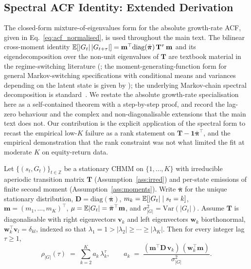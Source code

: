 \subsection{Spectral ACF Identity: Extended Derivation}
\label{sec:supp_spectral_acf}

The closed-form mixture-of-eigenvalues form for the absolute growth-rate ACF, given in Eq.~\eqref{eq:acf_normalised}, is used throughout the main text. The bilinear cross-moment identity $\mathbb{E}[|G_t|\,|G_{t+\tau}|] = \mathbf m^\top \mathrm{diag}(\bar{\boldsymbol\pi})\,\mathbf T^\tau\,\mathbf m$ and its eigendecomposition over the non-unit eigenvalues of $\mathbf T$ are textbook material in the regime-switching literature (\citealp{hamilton1994time,krolzig1997markov}; the moment-generating-function form for general Markov-switching specifications with conditional means and variances depending on the latent state is given by \citealp{timmermann2000moments}); the underlying Markov-chain spectral decomposition is standard~\cite{levinperes2017markov}. We restate the absolute growth-rate specialisation here as a self-contained theorem with a step-by-step proof, and record the lag-zero behaviour and the complex and non-diagonalisable extensions that the main text does not. Our contribution is the explicit application of the spectral form to recast the empirical \citet{ryden1998stylized} low-$K$ failure as a rank statement on $\mathbf T - \mathbf 1\bar{\boldsymbol\pi}^\top$, and the empirical demonstration that the rank constraint was not what limited the fit at moderate $K$ on equity-return data.

\begin{theorem}
\label{thm:supp_spectral_acf}
Let $\{(s_t, G_t)\}_{t \in \mathbb{Z}}$ be a stationary CHMM on $\{1, \ldots, K\}$ with irreducible aperiodic transition matrix $\mathbf T$ (Assumption~\ref{ass:irred}) and per-state emissions of finite second moment (Assumption~\ref{ass:moments}). Write $\bar{\boldsymbol\pi}$ for the unique stationary distribution, $\mathbf D = \mathrm{diag}(\bar{\boldsymbol\pi})$, $m_k = \mathbb{E}[|G_t| \mid s_t = k]$, $\mathbf m = (m_1, \ldots, m_K)^\top$, $\mu = \mathbb{E}|G_t| = \bar{\boldsymbol\pi}^\top \mathbf m$, and $\sigma_{|G|}^2 = \mathrm{Var}(|G_t|)$. Assume $\mathbf T$ is diagonalisable with right eigenvectors $\mathbf v_k$ and left eigenvectors $\mathbf w_k$ biorthonormal, $\mathbf w_k^\top \mathbf v_l = \delta_{kl}$, indexed so that $\lambda_1 = 1 > |\lambda_2| \ge \cdots \ge |\lambda_K|$. Then for every integer lag $\tau \ge 1$,
\begin{equation*}
    \rho_{|G|}(\tau)
    \;=\; \sum_{k=2}^{K} a_k\, \lambda_k^{\tau},
    \qquad
    a_k \;=\; \frac{(\mathbf m^\top \mathbf D\, \mathbf v_k)\,(\mathbf w_k^\top \mathbf m)}{\sigma_{|G|}^2}.
\end{equation*}
\end{theorem}

